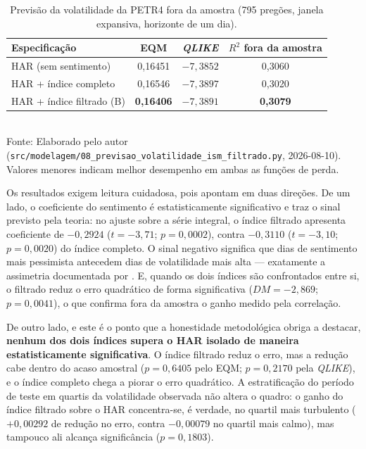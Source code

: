 \begin{table}[htpb]
\centering
\caption{Previsão da volatilidade da PETR4 fora da amostra (795 pregões, janela expansiva, horizonte de um dia).}
\label{tab:previsao_vol_ism}
\begin{tabular}{l c c c}
\hline
\textbf{Especificação} & \textbf{EQM} & \textbf{\textit{QLIKE}} & \textbf{$R^2$ fora da amostra} \\ \hline
HAR (sem sentimento) & 0,16451 & $-7{,}3852$ & 0,3060 \\
HAR + índice completo & 0,16546 & $-7{,}3897$ & 0,3020 \\
HAR + índice filtrado (B) & \textbf{0,16406} & $-7{,}3891$ & \textbf{0,3079} \\
\hline
\end{tabular}
\vspace{0.2cm}
{\small \\ Fonte: Elaborado pelo autor (\texttt{src/modelagem/08\_previsao\_volatilidade\_ism\_filtrado.py}, 2026-08-10). Valores menores indicam melhor desempenho em ambas as funções de perda.}
\end{table}

Os resultados exigem leitura cuidadosa, pois apontam em duas direções. De um lado, o coeficiente do
sentimento é estatisticamente significativo e traz o sinal previsto pela teoria: no ajuste sobre a
série integral, o índice filtrado apresenta coeficiente de $-0{,}2924$ ($t = -3{,}71$;
$p = 0{,}0002$), contra $-0{,}3110$ ($t = -3{,}10$; $p = 0{,}0020$) do índice completo. O sinal
negativo significa que dias de sentimento mais pessimista antecedem dias de volatilidade mais alta ---
exatamente a assimetria documentada por . E, quando os dois índices
são confrontados entre si, o filtrado reduz o erro quadrático de forma significativa
($DM = -2{,}869$; $p = 0{,}0041$), o que confirma fora da amostra o ganho medido pela correlação.

De outro lado, e este é o ponto que a honestidade metodológica obriga a destacar, \textbf{nenhum dos
dois índices supera o HAR isolado de maneira estatisticamente significativa}. O índice filtrado
reduz o erro, mas a redução cabe dentro do acaso amostral ($p = 0{,}6405$ pelo EQM;
$p = 0{,}2170$ pela \textit{QLIKE}), e o índice completo chega a piorar o erro quadrático. A
estratificação do período de teste em quartis da volatilidade observada não altera o quadro: o
ganho do índice filtrado sobre o HAR concentra-se, é verdade, no quartil mais turbulento
($+0{,}00292$ de redução no erro, contra $-0{,}00079$ no quartil mais calmo), mas tampouco ali
alcança significância ($p = 0{,}1803$).

